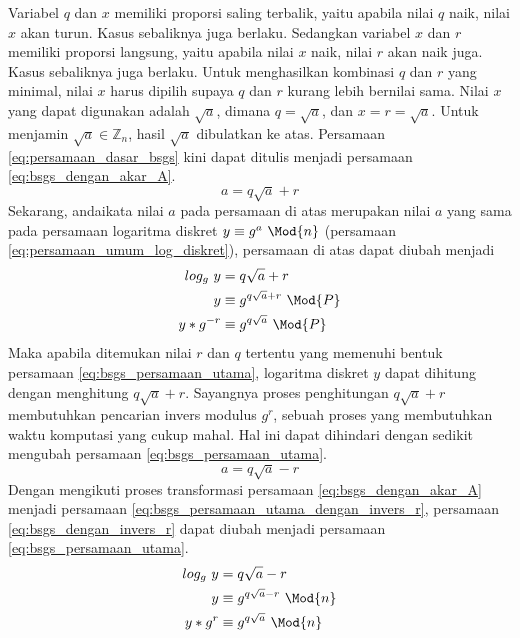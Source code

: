 Variabel $ q $ dan $ x $ memiliki proporsi saling terbalik, yaitu apabila nilai $ q $ naik, nilai $ x $ akan turun. Kasus sebaliknya juga berlaku. Sedangkan variabel $ x $ dan $ r $ memiliki proporsi langsung, yaitu apabila nilai $ x $ naik, nilai $ r $ akan naik juga. Kasus sebaliknya juga berlaku. Untuk menghasilkan kombinasi $ q $ dan $ r $ yang minimal, nilai $ x $ harus dipilih supaya $ q $ dan $ r $ kurang lebih bernilai sama. Nilai $ x $ yang dapat digunakan adalah $ \sqrt{a} $, dimana $ q=\sqrt{a} $, dan $ x=r=\sqrt{a} $. Untuk menjamin $ \sqrt{a} \in \mathbb{Z}_n $, hasil $ \sqrt{a} $ dibulatkan ke atas. Persamaan \eqref{eq:persamaan_dasar_bsgs} kini dapat ditulis menjadi persamaan \eqref{eq:bsgs_dengan_akar_A}.
\begin{equation}
a=q\sqrt{a}+r
\label{eq:bsgs_dengan_akar_A}
\end{equation}
Sekarang, andaikata nilai $ a $ pada persamaan di atas merupakan nilai $ a $ yang sama pada persamaan logaritma diskret $ y \equiv g^a\ \Mod{n} $ (persamaan \eqref{eq:persamaan_umum_log_diskret}), persamaan di atas dapat diubah menjadi
\begin{align}
log_{g}\ y &= q\sqrt{a}+r \\
y &\equiv g^{q\sqrt{a}+r}\ \Mod{P} \\
y*g^{-r} &\equiv g^{q\sqrt{a}}\ \Mod{P}
\label{eq:bsgs_persamaan_utama_dengan_invers_r}
\end{align}
Maka apabila ditemukan nilai $ r $ dan $ q $ tertentu yang memenuhi bentuk persamaan \eqref{eq:bsgs_persamaan_utama}, logaritma diskret $ y $ dapat dihitung dengan menghitung $ q\sqrt{a}+r $. Sayangnya proses penghitungan $ q\sqrt{a}+r $ membutuhkan pencarian invers modulus $ g^r $, sebuah proses yang membutuhkan waktu komputasi yang cukup mahal. Hal ini dapat dihindari dengan sedikit mengubah persamaan \eqref{eq:bsgs_persamaan_utama}.
\begin{equation}
a=q\sqrt{a}-r
\label{eq:bsgs_dengan_invers_r}
\end{equation}
Dengan mengikuti proses transformasi persamaan \eqref{eq:bsgs_dengan_akar_A} menjadi persamaan \eqref{eq:bsgs_persamaan_utama_dengan_invers_r}, persamaan \eqref{eq:bsgs_dengan_invers_r} dapat diubah menjadi persamaan \eqref{eq:bsgs_persamaan_utama}.
\begin{align}
log_{g}\ y &= q\sqrt{a} - r \\
y &\equiv g^{q\sqrt{a} - r}\ \Mod{n} \\
y*g^r &\equiv g^{q\sqrt{a}}\ \Mod{n}
\label{eq:bsgs_persamaan_utama}
\end{align}
